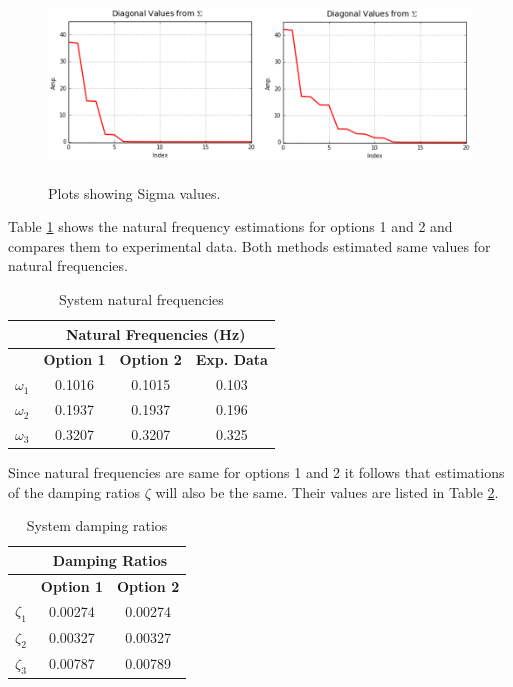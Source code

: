 \documentclass[paper=a4, fontsize=12pt]{scrartcl} %
\begin{document}
%
\begin{figure}[H]
	\centering
	\includegraphics[height = 5.0cm]{SigmaPlotBoth.png}
	\caption{Plots showing Sigma values.}
	\label{fig:SigmaPlotBoth}
\end{figure}
%
Table \ref{tab:NatFreq} shows the natural frequency estimations for options 1 and 2 and compares them to experimental data. Both methods estimated same values for natural frequencies.
%
\begin{table}[H]
  \centering
  \caption{System natural frequencies}
    \begin{tabular}{rccc}
    \toprule
          & \multicolumn{3}{c}{\textbf{Natural Frequencies (Hz)}} \\
    \midrule
    \multicolumn{1}{c}{} & \textbf{Option 1} & \textbf{Option 2} & \textbf{Exp. Data} \\
    \multicolumn{1}{c}{$\omega_1$} & 0.1016 & 0.1015 & 0.103 \\
    \multicolumn{1}{c}{$\omega_2$} & 0.1937 & 0.1937 & 0.196 \\
    \multicolumn{1}{c}{$\omega_3$} & 0.3207 & 0.3207 & 0.325 \\
    \bottomrule
    \end{tabular}%
  \label{tab:NatFreq}%
\end{table}%
%
%
Since natural frequencies are same for options 1 and 2 it follows that estimations of the damping ratios $\zeta$ will also be the same. Their values are listed in Table \ref{tab:DampRat}.
%
\begin{table}[H]
  \centering
  \caption{System damping ratios}
    \begin{tabular}{rcc}
    \toprule
          & \multicolumn{2}{c}{\textbf{Damping Ratios}} \\
    \midrule
    \multicolumn{1}{c}{} & \textbf{Option 1} & \textbf{Option 2} \\
    \multicolumn{1}{c}{$\zeta_1$} & 0.00274 & 0.00274 \\
    \multicolumn{1}{c}{$\zeta_2$} & 0.00327 & 0.00327 \\
    \multicolumn{1}{c}{$\zeta_3$} & 0.00787 & 0.00789 \\
    \bottomrule
    \end{tabular}%
  \label{tab:DampRat}%
\end{table}%
\end{document}
